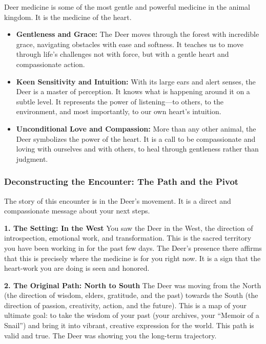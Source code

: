 \documentclass{article}
\begin{document}
Deer medicine is some of the most gentle and powerful medicine in the
animal kingdom. It is the medicine of the heart.

\begin{itemize}
\item
  \textbf{Gentleness and Grace:} The Deer moves through the forest with
  incredible grace, navigating obstacles with ease and softness. It
  teaches us to move through life's challenges not with force, but with
  a gentle heart and compassionate action.
\item
  \textbf{Keen Sensitivity and Intuition:} With its large ears and alert
  senses, the Deer is a master of perception. It knows what is happening
  around it on a subtle level. It represents the power of listening---to
  others, to the environment, and most importantly, to our own heart's
  intuition.
\item
  \textbf{Unconditional Love and Compassion:} More than any other
  animal, the Deer symbolizes the power of the heart. It is a call to be
  compassionate and loving with ourselves and with others, to heal
  through gentleness rather than judgment.
\end{itemize}

\subsubsection*{Deconstructing the Encounter: The Path and the
Pivot}\label{deconstructing-the-encounter-the-path-and-the-pivot}

The story of this encounter is in the Deer's movement. It is a direct
and compassionate message about your next steps.

\textbf{1. The Setting: In the West} You saw the Deer in the West, the
direction of introspection, emotional work, and transformation. This is
the sacred territory you have been working in for the past few days. The
Deer's presence there affirms that this is precisely where the medicine
is for you right now. It is a sign that the heart-work you are doing is
seen and honored.

\textbf{2. The Original Path: North to South} The Deer was moving from
the North (the direction of wisdom, elders, gratitude, and the past)
towards the South (the direction of passion, creativity, action, and the
future). This is a map of your ultimate goal: to take the wisdom of your
past (your archives, your ``Memoir of a Snail'') and bring it into
vibrant, creative expression for the world. This path is valid and true.
The Deer was showing you the long-term trajectory.
\end{document}

